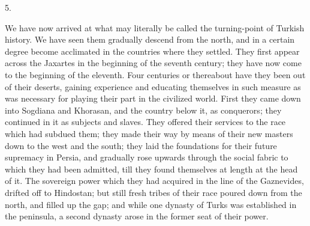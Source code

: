 5.

We have now arrived at what
may literally be called the turning-point of Turkish history. We have
seen them gradually descend from the north, and in a certain degree
become acclimated in the countries where they settled. They first
appear across the Jaxartes in the beginning of the seventh century;
they have now come to the beginning of the eleventh. Four centuries or
thereabout have they been out of their deserts, gaining experience and
educating themselves in such measure as was necessary for playing
their part in the civilized world. First they came down into Sogdiana
and Khorasan, and the country below it, as conquerors; they continued
in it as subjects and slaves. They offered their services to the race
which had subdued them; they made their way by means of their new
masters down to the west and the south; they laid the foundations for
their future supremacy in Persia, and gradually rose upwards through
the social fabric to which they had been admitted, till they found
themselves at length at the head of it. The sovereign power which they
had acquired in the line of the Gaznevides, drifted off to Hindostan;
but still fresh tribes of their race poured down from the north, and
filled up the gap; and while one dynasty of Turks was established in
the peninsula, a second dynasty arose in the former seat of their
power.

